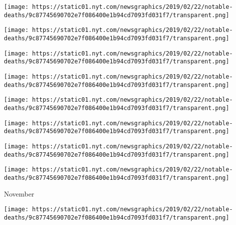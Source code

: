 \href{https://www.nytimes.com/2019/12/04/obituaries/josie-rubio-dead.html}{}

\texttt{[image: https://static01.nyt.com/newsgraphics/2019/02/22/notable-deaths/9c87745690702e7f086400e1b94cd7093fd031f7/transparent.png]}

\href{https://www.nytimes.com/2019/12/03/arts/dc-fontana-star-trek.html}{}

\texttt{[image: https://static01.nyt.com/newsgraphics/2019/02/22/notable-deaths/9c87745690702e7f086400e1b94cd7093fd031f7/transparent.png]}

\href{https://www.nytimes.com/2019/12/03/dining/andre-daguin-dead.html}{}

\texttt{[image: https://static01.nyt.com/newsgraphics/2019/02/22/notable-deaths/9c87745690702e7f086400e1b94cd7093fd031f7/transparent.png]}

\href{https://www.nytimes.com/2019/12/02/books/robert-k-massie-dead.html}{}

\texttt{[image: https://static01.nyt.com/newsgraphics/2019/02/22/notable-deaths/9c87745690702e7f086400e1b94cd7093fd031f7/transparent.png]}

\href{https://www.nytimes.com/2019/12/02/arts/music/mariss-jansons-dead.html}{}

\texttt{[image: https://static01.nyt.com/newsgraphics/2019/02/22/notable-deaths/9c87745690702e7f086400e1b94cd7093fd031f7/transparent.png]}

\href{https://www.nytimes.com/2019/12/02/arts/television/shelley-morrison-dead.html}{}

\texttt{[image: https://static01.nyt.com/newsgraphics/2019/02/22/notable-deaths/9c87745690702e7f086400e1b94cd7093fd031f7/transparent.png]}

\href{https://www.nytimes.com/2019/12/01/obituaries/michael-howard-dead.html}{}

\texttt{[image: https://static01.nyt.com/newsgraphics/2019/02/22/notable-deaths/9c87745690702e7f086400e1b94cd7093fd031f7/transparent.png]}

\href{https://www.nytimes.com/2019/12/01/arts/music/irving-burgie-dead.html}{}

\texttt{[image: https://static01.nyt.com/newsgraphics/2019/02/22/notable-deaths/9c87745690702e7f086400e1b94cd7093fd031f7/transparent.png]}

November

\href{https://www.nytimes.com/2019/11/28/obituaries/yasuhiro-nakasone-dies-japan.html}{}

\texttt{[image: https://static01.nyt.com/newsgraphics/2019/02/22/notable-deaths/9c87745690702e7f086400e1b94cd7093fd031f7/transparent.png]}


